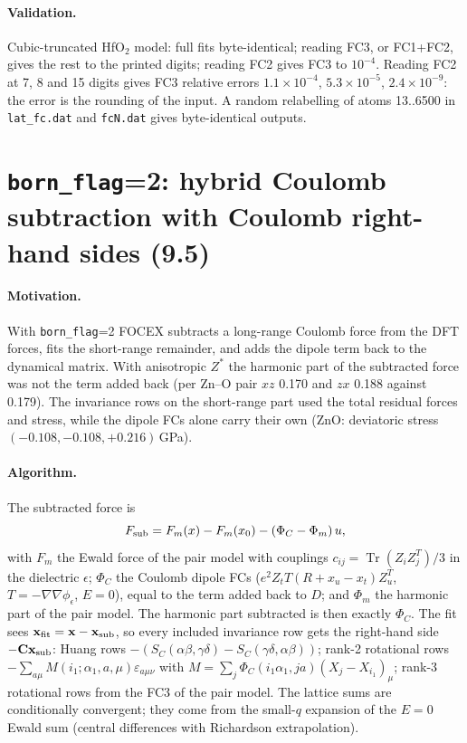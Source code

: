 \documentclass[11pt,a4paper]{article}
\newcommand{\bC}{\mathbf C}
\newcommand{\bx}{\mathbf x}
\newcommand{\code}[1]{\texttt{#1}}
\newcommand{\Tr}{\operatorname{Tr}}
\begin{document}
\paragraph{Validation.} Cubic-truncated HfO$_2$ model: full fits byte-identical; reading FC3, or FC1+FC2,
gives the rest to the printed digits; reading FC2 gives FC3 to $10^{-4}$. Reading FC2 at 7, 8 and 15 digits
gives FC3 relative errors $1.1\times10^{-4}$, $5.3\times10^{-5}$, $2.4\times10^{-9}$: the error is the rounding of
the input. A random relabelling of atoms 13..6500 in \code{lat\_fc.dat} and \code{fcN.dat} gives
byte-identical outputs.

\section{\texorpdfstring{\code{born\_flag}=2: hybrid Coulomb subtraction with Coulomb right-hand sides (9.5)}{born\_flag=2: hybrid Coulomb subtraction with Coulomb right-hand sides (9.5)}}\label{sec:hybrid}
\paragraph{Motivation.} With \code{born\_flag}=2 FOCEX subtracts a long-range Coulomb force from the DFT
forces, fits the short-range remainder, and adds the dipole term back to the dynamical matrix. With
anisotropic $Z^*$ the harmonic part of the subtracted force was not the term added back (per Zn--O pair
$xz$ 0.170 and $zx$ 0.188 against 0.179). The invariance rows on the short-range part used the total
residual forces and stress, while the dipole FCs alone carry their own (ZnO: deviatoric stress
$(-0.108,-0.108,+0.216)$\,GPa).

\paragraph{Algorithm.} The subtracted force is
\begin{equation}
F_{\rm sub}=F_m(x)-F_m(x_0)-(\Phi_C-\Phi_m)\,u ,
\end{equation}
with $F_m$ the Ewald force of the pair model with couplings $c_{ij}=\Tr(Z_iZ_j^T)/3$ in the dielectric
$\epsilon$; $\Phi_C$ the Coulomb dipole FCs ($e^2Z_tT(R+x_u-x_t)Z_u^T$, $T=-\nabla\nabla\phi_\epsilon$,
$E=0$), equal to the term added back to $D$; and $\Phi_m$ the harmonic part of the pair model. The
harmonic part subtracted is then exactly $\Phi_C$. The fit sees $\bx_{\rm fit}=\bx-\bx_{\rm sub}$, so every
included invariance row gets the right-hand side $-\bC\bx_{\rm sub}$: Huang rows
$-(S_C(\alpha\beta,\gamma\delta)-S_C(\gamma\delta,\alpha\beta))$; rank-2 rotational rows
$-\sum_{a\mu}M(i_1;\alpha_1,a,\mu)\varepsilon_{a\mu\nu}$ with $M=\sum_j\Phi_C(i_1\alpha_1,ja)(X_j-X_{i_1})_\mu$;
rank-3 rotational rows from the FC3 of the pair model. The lattice sums are conditionally convergent;
they come from the small-$q$ expansion of the $E=0$ Ewald sum (central differences with Richardson
extrapolation).
\end{document}
